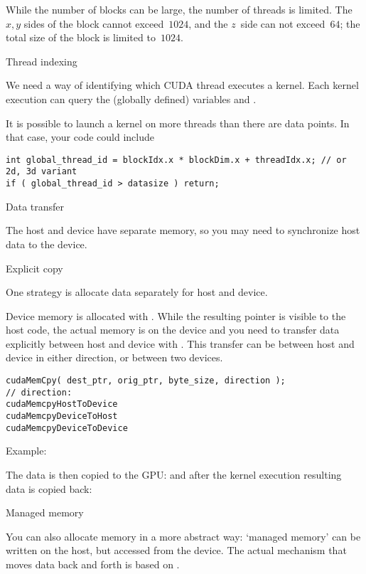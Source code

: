 While the number of blocks can be large, the number of threads is limited.
The $x,y$ sides of the block cannot exceed~$1024$, and the $z$~side
can not exceed~$64$; the total size of the block is limited to~$1024$.

 {Thread indexing}

We need a way of identifying which CUDA thread executes a kernel.
Each kernel execution can query the (globally defined) variables
 and .

It is possible to launch a kernel on more threads than
there are data points. In that case, your code could include
\begin{lstlisting}
int global_thread_id = blockIdx.x * blockDim.x + threadIdx.x; // or 2d, 3d variant
if ( global_thread_id > datasize ) return;
\end{lstlisting}

 {Data transfer}

The host and device have separate memory, so you may need to
synchronize host data to the device.

 {Explicit copy}

One strategy is allocate data separately for host and device.

Device memory is allocated with .
While the resulting pointer is visible to the host code,
the actual memory is on the device and you need to transfer data explicitly
between host and device with .
This transfer can be between host and device in either direction,
or between two devices.

\begin{lstlisting}
cudaMemCpy( dest_ptr, orig_ptr, byte_size, direction );
// direction:
cudaMemcpyHostToDevice
cudaMemcpyDeviceToHost
cudaMemcpyDeviceToDevice
\end{lstlisting}

Example:

The data is then copied to the \ac{GPU}:
and after the kernel execution resulting data is copied back:

 {Managed memory}

You can also allocate memory in a more abstract way:
`managed memory' can be written on the host,
but accessed from the device.
The actual mechanism that moves data back and forth
is based on .
